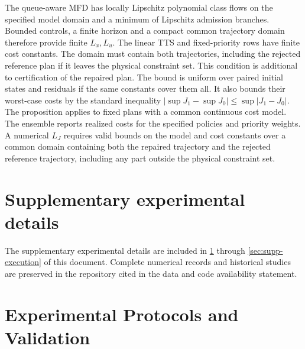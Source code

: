 \documentclass[preprint,12pt]{elsarticle}
\newcommand{\appref}[1]{\ref{#1}}
\begin{document}
The queue-aware MFD has locally Lipschitz polynomial class flows on the
specified model domain and a minimum of Lipschitz admission branches.
Bounded controls, a finite horizon and a compact common trajectory domain
therefore provide finite $L_x,L_u$. The linear TTS and fixed-priority rows
have finite cost constants. The domain must contain both trajectories,
including the rejected reference plan if it leaves the physical constraint
set. This condition is additional to certification of the repaired plan.
The bound is uniform over paired initial states and residuals if the same
constants cover them all. It also bounds their worst-case costs by the
standard inequality $|\sup J_1-\sup J_0|\le\sup|J_1-J_0|$.
The proposition applies to fixed plans with a common continuous cost model.
The ensemble reports realized costs for the specified policies and
priority weights. A numerical $L_J$ requires valid bounds on the model and
cost constants over a common domain containing both the repaired trajectory
and the rejected reference trajectory, including any part outside the
physical constraint set.

\FloatBarrier
\section*{Supplementary experimental details}
The supplementary experimental details are included in
\appref{app:reusable-benchmark} through \appref{sec:supp-execution}
of this document. Complete numerical records and historical studies
are preserved in the repository cited in the data and code availability
statement.

\section{Experimental Protocols and Validation}
\label{app:reusable-benchmark}
\end{document}
